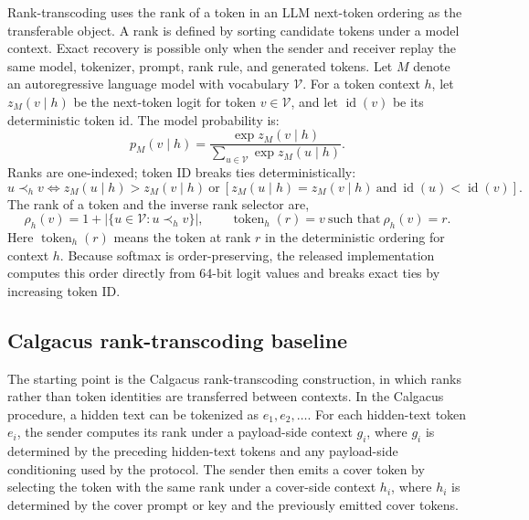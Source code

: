 \documentclass[fleqn,10pt]{wlscirep}
\begin{document}
Rank-transcoding uses the rank of a token in an LLM next-token ordering as the transferable object. A rank is defined by sorting candidate tokens under a model context. Exact recovery is possible only when the sender and receiver replay the same model, tokenizer, prompt, rank rule, and generated tokens.
Let \(M\) denote an autoregressive language model with vocabulary \(\mathcal{V}\). For a token context \(h\), let \(z_M(v\mid h)\) be the next-token logit for token \(v\in\mathcal{V}\), and let \(\operatorname{id}(v)\) be its deterministic token id. The model probability is:
\begin{equation}
p_M(v\mid h)=
\frac{\exp z_M(v\mid h)}
{\sum_{u\in\mathcal V}\exp z_M(u\mid h)}.
\label{eq:next-token-prob}
\end{equation}
Ranks are one-indexed; token ID breaks ties deterministically:
\begin{equation}
u \prec_h v
\Longleftrightarrow
z_M(u\mid h)>z_M(v\mid h)
\ \text{or}\
\left[z_M(u\mid h)=z_M(v\mid h)\ \text{and}\ \operatorname{id}(u)<\operatorname{id}(v)\right].
\label{eq:rank-order}
\end{equation}
The rank of a token and the inverse rank selector are,
\begin{equation}
\rho_h(v)=1+\left|\{u\in\mathcal V:u\prec_h v\}\right|,
\qquad
\operatorname{token}_h(r)=v\ \text{such that}\ \rho_h(v)=r.
\label{eq:rank-function}
\end{equation}
Here \(\operatorname{token}_h(r)\) means the token at rank \(r\) in the deterministic ordering for context \(h\). Because softmax is order-preserving, the released implementation computes this order directly from 64-bit logit values and breaks exact ties by increasing token ID.

\subsection*{Calgacus rank-transcoding baseline}\label{sec:calgacus-method}

The starting point is the Calgacus rank-transcoding construction, in which ranks rather than token identities are transferred between contexts\cite{NorelliBronstein2026Calgacus}. In the Calgacus procedure, a hidden text can be tokenized as \(e_1,e_2,\ldots\). For each hidden-text token \(e_i\), the sender computes its rank under a payload-side context \(g_i\), where \(g_i\) is determined by the preceding hidden-text tokens and any payload-side conditioning used by the protocol. The sender then emits a cover token by selecting the token with the same rank under a cover-side context \(h_i\), where \(h_i\) is determined by the cover prompt or key and the previously emitted cover tokens.
\end{document}
